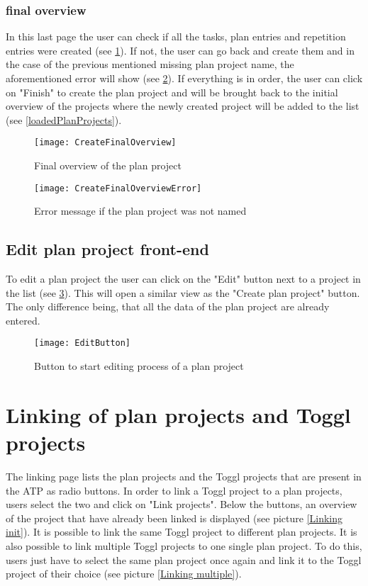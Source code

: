 \subsubsection{final overview}
In this last page the user can check if all the tasks, plan entries and repetition entries were created (see \ref{createFinalOverview}). If not, the user can go back and create them and in the case of the previous mentioned missing plan project name, the aforementioned error will show (see \ref{createFinalOverviewError}). If everything is in order, the user can click on "Finish" to create the plan project and will be brought back to the initial overview of the projects where the newly created project will be added to the list (see \ref{loadedPlanProjects}).
\begin{figure}[H]
	\centering
	\texttt{[image: CreateFinalOverview]}
	\caption{Final overview of the plan project}
	\label{createFinalOverview}
\end{figure}
\begin{figure}[H]
	\centering
	\texttt{[image: CreateFinalOverviewError]}
	\caption{Error message if the plan project was not named}
	\label{createFinalOverviewError}
\end{figure}

\subsection{Edit plan project front-end}
To edit a plan project the user can click on the "Edit" button next to a project in the list (see \ref{editButton}). This will open a similar view as the "Create plan project" button. The only difference being, that all the data of the plan project are already entered.
\begin{figure}[H]
	\centering
	\texttt{[image: EditButton]}
	\caption{Button to start editing process of a plan project}
	\label{editButton}
\end{figure}

\section{Linking of plan projects and Toggl projects} \label{Linking}
The linking page lists the plan projects and the Toggl projects that are present in the ATP as radio buttons. In order to link a Toggl project to a plan projects, users select the two and click on "Link projects". Below the buttons, an overview of the project that have already been linked is displayed (see picture \ref{Linking init}). It is possible to link the same Toggl project to different plan projects. It is also possible to link multiple Toggl projects to one single plan project. To do this, users just have to select the same plan project once again and link it to the Toggl project of their choice (see picture \ref{Linking multiple}).


